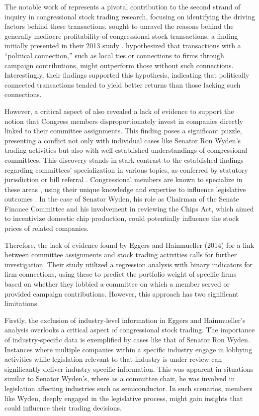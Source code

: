 \documentclass[15pt,letterpaper]{article}
\begin{document}
The notable work of \cite{eg14} represents a pivotal contribution to the second strand of inquiry in congressional stock trading research, focusing on identifying the driving factors behind these transactions. \cite{eg14} sought to unravel the reasons behind the generally mediocre profitability of congressional stock transactions, a finding initially presented in their 2013 study \citep{eg13}. \cite{eg14} hypothesized that transactions with a “political connection,” such as local ties or connections to firms through campaign contributions, might outperform those without such connections. Interestingly, their findings supported this hypothesis, indicating that politically connected transactions tended to yield better returns than those lacking such connections.

However, a critical aspect of \cite{eg14} also revealed a lack of evidence to support the notion that Congress members disproportionately invest in companies directly linked to their committee assignments. This finding poses a significant puzzle, presenting a conflict not only with individual cases like Senator Ron Wyden's trading activities but also with well-established understandings of congressional committees. This discovery stands in stark contrast to the established findings regarding committees’ specialization in various topics, as conferred by statutory jurisdiction \citep{myers2009} or bill referral \citep{king1994}. Congressional members are known to specialize in these areas \citep{Asher1974CommitteesAT}, using their unique knowledge and expertise to influence legislative outcomes \citep{10.2307/40709444, 10.2307/2111156, kiewiet1991logic, krehbiel1992information, curry2018knowledge}. In the case of Senator Wyden, his role as Chairman of the Senate Finance Committee and his involvement in reviewing the Chips Act, which aimed to incentivize domestic chip production, could potentially influence the stock prices of related companies.

Therefore, the lack of evidence found by Eggers and Hainmueller (2014) for a link between committee assignments and stock trading activities calls for further investigation. Their study utilized a regression analysis with binary indicators for firm connections, using these to predict the portfolio weight of specific firms based on whether they lobbied a committee on which a member served or provided campaign contributions. However, this approach has two significant limitations.

Firstly, the exclusion of industry-level information in Eggers and Hainmueller's analysis overlooks a critical aspect of congressional stock trading. The importance of industry-specific data is exemplified by cases like that of Senator Ron Wyden. Instances where multiple companies within a specific industry engage in lobbying activities while legislation relevant to that industry is under review can significantly deliver industry-specific information. This was apparent in situations similar to Senator Wyden's, where as a committee chair, he was involved in legislation affecting industries such as semiconductor. In such scenarios, members like Wyden, deeply engaged in the legislative process, might gain insights that could influence their trading decisions. 
\end{document}
